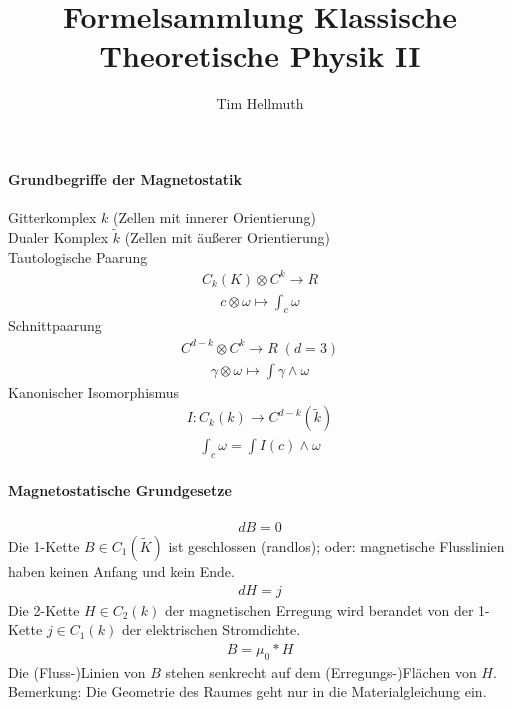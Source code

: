 \documentclass[10pt,a4paper]{article}
\author{Tim Hellmuth}
\title{Formelsammlung Klassische Theoretische Physik II}
\begin{document}
\maketitle
{}
\paragraph{Grundbegriffe der Magnetostatik} $\,$ \\
Gitterkomplex $k$ (Zellen mit innerer Orientierung) \\
Dualer Komplex $ \tilde{k} $ (Zellen mit äußerer Orientierung)\\
Tautologische Paarung \\
\begin{align}
C_k(K) \otimes C^k \longrightarrow R
\end{align}
\begin{align}
c \otimes \omega \longmapsto \int_c \omega
\end{align}
Schnittpaarung
\begin{align}
C^{d-k} \otimes C^k \longrightarrow R \; (d=3)
\end{align}
\begin{align}
\gamma \otimes \omega \longmapsto \int \gamma \wedge \omega
\end{align}
Kanonischer Isomorphismus
\begin{align}
I : C_k(k) \longrightarrow C^{d-k} (\tilde{k})
\end{align}
\begin{align}
\int_c \omega = \int I (c) \wedge \omega
\end{align}
\paragraph{Magnetostatische Grundgesetze}
\begin{align}
dB=0
\end{align}
Die 1-Kette $ B \in C_1 (\tilde{K}) $ ist geschlossen (randlos); oder: magnetische Flusslinien haben keinen Anfang und kein Ende.
\begin{align}
dH=j
\end{align}
Die 2-Kette $ H \in C_2 (k) $ der magnetischen Erregung wird berandet von der 1-Kette $ j \in C_1 (k) $ der elektrischen Stromdichte.
\begin{align}
B = \mu_0 * H
\end{align}
Die (Fluss-)Linien von $B$ stehen senkrecht auf dem (Erregungs-)Flächen von $H$.\\
Bemerkung: Die Geometrie des Raumes geht nur in die Materialgleichung ein.
\end{document}
